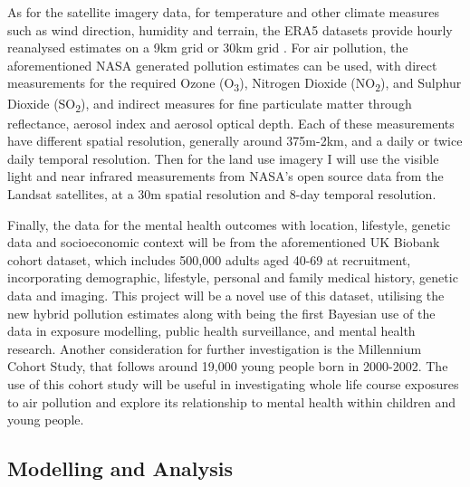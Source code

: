 As for the satellite imagery data, for temperature and other climate measures such as wind direction, humidity and terrain, the ERA5 datasets provide hourly reanalysed estimates on a 9km grid or 30km grid \citep{Copernicus2019ERA5-LandPresent}. For air pollution, the aforementioned NASA generated pollution estimates can be used, with direct measurements for the required Ozone (O\textsubscript{3}), Nitrogen Dioxide (NO\textsubscript{2}), and Sulphur Dioxide (SO\textsubscript{2}), and indirect measures for fine particulate matter through reflectance, aerosol index and aerosol optical depth. Each of these measurements have different spatial resolution, generally around 375m-2km, and a daily or twice daily temporal resolution. Then for the land use imagery I will use the visible light and near infrared measurements from NASA's open source data from the Landsat satellites, at a 30m spatial resolution and 8-day temporal resolution. 


Finally, the data for the mental health outcomes with location, lifestyle, genetic data and socioeconomic context will be from the aforementioned UK Biobank cohort dataset, which includes 500,000 adults aged 40-69 at recruitment, incorporating demographic, lifestyle, personal and family medical history, genetic data and imaging. This project will be a novel use of this dataset, utilising the new hybrid pollution estimates along with being the first Bayesian use of the data in exposure modelling, public health surveillance, and mental health research. Another consideration for further investigation is the Millennium Cohort Study, that follows around 19,000 young people born in 2000-2002. The use of this cohort study will be useful in investigating whole life course exposures to air pollution and explore its relationship to mental health within children and young people.


\subsection{Modelling and Analysis}

